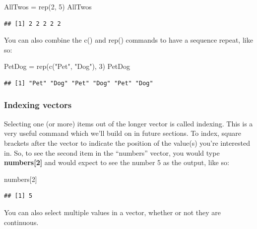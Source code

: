 \documentclass[
]{book}
\newenvironment{Shaded}{\begin{snugshade}}{\end{snugshade}}
\newcommand{\DecValTok}[1]{\textcolor[rgb]{0.00,0.00,0.81}{#1}}
\newcommand{\FunctionTok}[1]{\textcolor[rgb]{0.00,0.00,0.00}{#1}}
\newcommand{\NormalTok}[1]{#1}
\newcommand{\OtherTok}[1]{\textcolor[rgb]{0.56,0.35,0.01}{#1}}
\newcommand{\StringTok}[1]{\textcolor[rgb]{0.31,0.60,0.02}{#1}}
\begin{document}
\begin{Shaded}
\begin{Highlighting}[]
\NormalTok{AllTwos }\OtherTok{=} \FunctionTok{rep}\NormalTok{(}\DecValTok{2}\NormalTok{, }\DecValTok{5}\NormalTok{) }
\NormalTok{AllTwos}
\end{Highlighting}
\end{Shaded}

\begin{verbatim}
## [1] 2 2 2 2 2
\end{verbatim}

You can also combine the c() and rep() commands to have a sequence repeat, like so:

\begin{Shaded}
\begin{Highlighting}[]
\NormalTok{PetDog }\OtherTok{=} \FunctionTok{rep}\NormalTok{(}\FunctionTok{c}\NormalTok{(}\StringTok{"Pet"}\NormalTok{, }\StringTok{"Dog"}\NormalTok{), }\DecValTok{3}\NormalTok{) }
\NormalTok{PetDog}
\end{Highlighting}
\end{Shaded}

\begin{verbatim}
## [1] "Pet" "Dog" "Pet" "Dog" "Pet" "Dog"
\end{verbatim}

\hypertarget{indexing-vectors}{%
\subsubsection{Indexing vectors}\label{indexing-vectors}}

Selecting one (or more) items out of the longer vector is called indexing. This is a very useful command which we'll build on in future sections. To index, square brackets after the vector to indicate the position of the value(s) you're interested in. So, to see the second item in the ``numbers'' vector, you would type \textbf{numbers{[}2{]}} and would expect to see the number 5 as the output, like so:

\begin{Shaded}
\begin{Highlighting}[]
\NormalTok{numbers[}\DecValTok{2}\NormalTok{]}
\end{Highlighting}
\end{Shaded}

\begin{verbatim}
## [1] 5
\end{verbatim}

You can also select multiple values in a vector, whether or not they are continuous.
\end{document}
